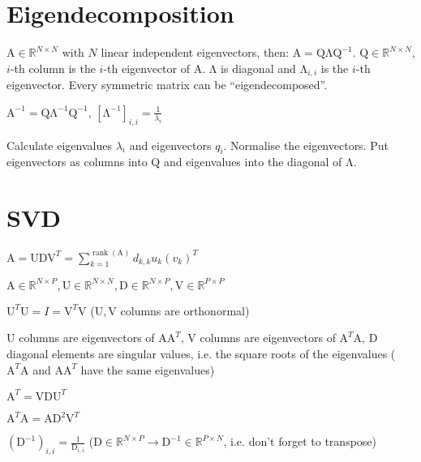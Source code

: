 \documentclass[a4paper, 11pt, landscape]{article}
\newcommand{\matr}[1]{\boldsymbol{\mathrm{#1}}}
\begin{document}
\begin{multicols*}{3}
\section{Eigendecomposition}
$\matr{A} \in \mathbb{R}^{N \times N}$ with $N$ linear independent eigenvectors, then: $\matr{A} = \matr{Q \Lambda Q}^{-1}$. $\matr{Q} \in \mathbb{R}^{N \times N}$, $i$-th column is the $i$-th eigenvector of $\matr{A}$. $\matr{\Lambda}$ is diagonal and $\matr{\Lambda}_{i,i}$ is the $i$-th eigenvector. Every symmetric matrix can be ``eigendecomposed''.

$\matr{A}^{-1} = \matr{Q} \matr{\Lambda}^{-1} \matr{Q}^{-1}$, $\left[ \matr{\Lambda}^{-1} \right]_{i,i} = \frac{1}{\lambda_i}$

Calculate eigenvalues $\lambda_i$ and eigenvectors $q_i$. Normalise the eigenvectors. Put eigenvectors as columns into $\matr{Q}$ and eigenvalues into the diagonal of $\matr{\Lambda}$.

\section{SVD}
\begin{compactitem}
	\item $\matr{A} = \matr{U} \matr{D} \matr{V}^T = \sum_{k=1}^{\operatorname{rank}(\matr{A})} d_{k,k} u_k (v_k)^T$
	\item $\matr{A} \in \mathbb{R}^{N \times P}, \matr{U} \in \mathbb{R}^{N \times N}, \matr{D} \in \mathbb{R}^{N \times P}, \matr{V} \in \mathbb{R}^{P \times P}$
	\item $\matr{U}^T \matr{U} = I = \matr{V}^T \matr{V}$ ($\matr{U}, \matr{V}$ columns are orthonormal)
	\item $\matr{U}$ columns are eigenvectors of $\matr{A} \matr{A}^T$, $\matr{V}$ columns are eigenvectors of $\matr{A}^T \matr{A}$, $\matr{D}$ diagonal elements are singular values, i.e. the square roots of the eigenvalues ($\matr{A}^T \matr{A}$ and $\matr{A} \matr{A}^T$ have the same eigenvalues)
	\item $\matr{A}^T = \matr{V} \matr{D} \matr{U}^T$
	\item $\matr{A}^T \matr{A} = \matr{A} \matr{D}^2 \matr{V}^T$
	\item $(\matr{D}^{-1})_{i,i} = \frac{1}{\matr{D}_{i, i}}$ ($\matr{D} \in \mathbb{R}^{N \times P} \to \matr{D}^{-1} \in \mathbb{R}^{P \times N}$, i.e. don't forget to transpose)
\end{compactitem}


\end{multicols*}
\end{document}
